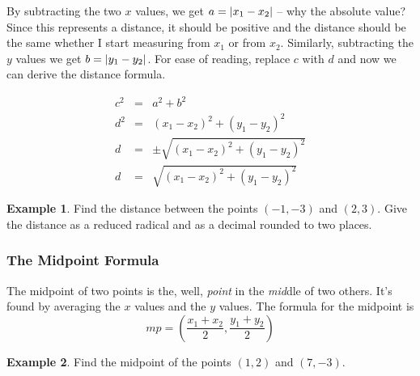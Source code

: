 \documentclass[addpoints,12pt]{exam}
\theoremstyle{definition}
\theoremstyle{break}
\theoremstyle{break}
\newtheorem{example}{Example}[subsection]
\begin{document}
By subtracting the two $x$ values, we get $a=\abs{x_1-x_2}$ -- why the absolute value? Since this represents a distance, it should be positive and the distance should be the same whether I start measuring from $x_1$ or from $x_2$. Similarly, subtracting the $y$ values we get $b=\abs{y_1-y_2}$. For ease of reading, replace $c$ with $d$ and now we can derive the distance formula.

\begin{eqnarray*}
c^2 &=& a^2 + b^2\\
d^2 &=& (x_1-x_2)^2 + (y_1-y_2)^2\\
d &=& \pm\sqrt{(x_1-x_2)^2 + (y_1-y_2)^2}\\
d &=& \sqrt{(x_1-x_2)^2 + (y_1-y_2)^2}
\end{eqnarray*}

\newpage

\begin{example}
Find the distance between the points $(-1,-3)$ and $(2,3)$. Give the distance as a reduced radical and as a decimal rounded to two places.
\vspace{2in}
\end{example}

\subsubsection*{The Midpoint Formula}
The midpoint of two points is the, well, \emph{point} in the \emph{mid}dle of two others. It's found by averaging the $x$ values and the $y$ values. The formula for the midpoint is \[mp = \left(\dfrac{x_1+x_2}{2},\dfrac{y_1+y_2}{2}\right)\]

\vspace{.2in}

\begin{example}
Find the midpoint of the points $(1,2)$ and $(7,-3)$.
\vspace{1in}
\end{example}
\end{document}
